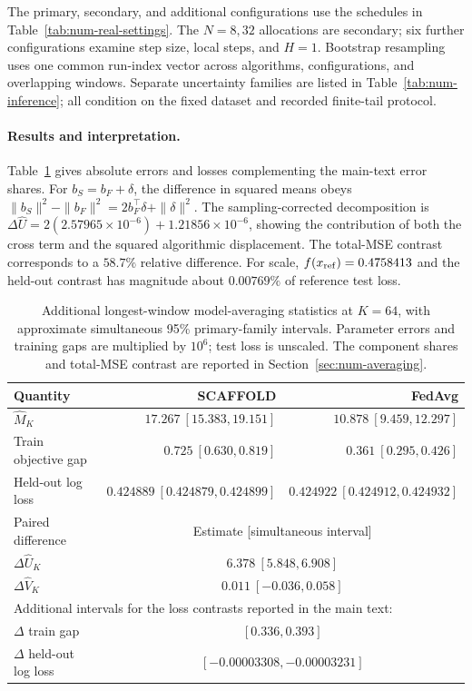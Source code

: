 The primary, secondary, and additional configurations use the schedules
in Table~\ref{tab:num-real-settings}. The $N=8,32$ allocations are
secondary; six further configurations examine step size, local steps,
and $H=1$. Bootstrap resampling uses one common run-index vector across
algorithms, configurations, and overlapping windows. Separate uncertainty
families are listed in Table~\ref{tab:num-inference}; all condition on
the fixed dataset and recorded finite-tail protocol.

\paragraph{Results and interpretation.}
Table~\ref{tab:e4-primary} gives absolute errors and losses complementing
the main-text error shares. For $b_S=b_F+\delta$, the difference in squared
means obeys $\|b_S\|^2-\|b_F\|^2=2b_F^\top\delta+\|\delta\|^2$.
The sampling-corrected decomposition is
$\Delta\widehat U=2(2.57965\times10^{-6})+1.21856\times10^{-6}$,
showing the contribution of both the cross term and the squared algorithmic
displacement. The total-MSE contrast corresponds to a $58.7\%$ relative
difference. For scale, $f(x_{\rm ref})=0.4758413$ and the held-out contrast
has magnitude about $0.00769\%$ of reference test loss.

\begin{table}[t]
\centering\small
\caption{Additional longest-window model-averaging statistics at $K=64$,
with approximate simultaneous 95\% primary-family intervals.
Parameter errors and training gaps are multiplied by $10^6$;
test loss is unscaled. The component shares and total-MSE contrast
are reported in Section~\ref{sec:num-averaging}.}
\label{tab:e4-primary}
\begin{tabular}{@{}lrr@{}}
\toprule
Quantity & SCAFFOLD & FedAvg \\
\midrule
$\widehat M_K$ & $17.267\ [15.383, 19.151]$ & $10.878\ [9.459, 12.297]$ \\
Train objective gap & $0.725\ [0.630, 0.819]$ & $0.361\ [0.295, 0.426]$ \\
Held-out log loss & $0.424889\ [0.424879, 0.424899]$ & $0.424922\ [0.424912, 0.424932]$ \\
\midrule
Paired difference & \multicolumn{2}{c}{Estimate [simultaneous interval]} \\
$\Delta\widehat U_K$ & \multicolumn{2}{c}{$6.378\ [5.848, 6.908]$} \\
$\Delta\widehat V_K$ & \multicolumn{2}{c}{$0.011\ [-0.036, 0.058]$} \\
\midrule
\multicolumn{3}{l}{Additional intervals for the loss contrasts reported in the main text:} \\
$\Delta$ train gap & \multicolumn{2}{c}{$[0.336, 0.393]$} \\
$\Delta$ held-out log loss & \multicolumn{2}{c}{$[-0.00003308, -0.00003231]$} \\
\bottomrule
\end{tabular}
\end{table}

